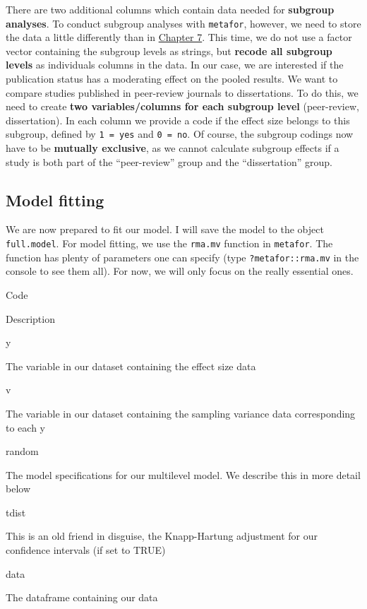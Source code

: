 \documentclass[]{book}
\begin{document}
There are two additional columns which contain data needed for \textbf{subgroup analyses}. To conduct subgroup analyses with \texttt{metafor}, however, we need to store the data a little differently than in \protect\hyperlink{subgroup}{Chapter 7}. This time, we do not use a factor vector containing the subgroup levels as strings, but \textbf{recode all subgroup levels} as individuals columns in the data. In our case, we are interested if the publication status has a moderating effect on the pooled results. We want to compare studies published in peer-review journals to dissertations. To do this, we need to create \textbf{two variables/columns for each subgroup level} (peer-review, dissertation). In each column we provide a code if the effect size belongs to this subgroup, defined by \texttt{1\ =\ yes} and \texttt{0\ =\ no}. Of course, the subgroup codings now have to be \textbf{mutually exclusive}, as we cannot calculate subgroup effects if a study is both part of the ``peer-review'' group and the ``dissertation'' group.

\hypertarget{model-fitting}{%
\subsection{Model fitting}\label{model-fitting}}

We are now prepared to fit our model. I will save the model to the object \texttt{full.model}. For model fitting, we use the \texttt{rma.mv} function in \texttt{metafor}. The function has plenty of parameters one can specify (type \texttt{?metafor::rma.mv} in the console to see them all). For now, we will only focus on the really essential ones.

Code

Description

y

The variable in our dataset containing the effect size data

v

The variable in our dataset containing the sampling variance data corresponding to each y

random

The model specifications for our multilevel model. We describe this in more detail below

tdist

This is an old friend in disguise, the Knapp-Hartung adjustment for our confidence intervals (if set to TRUE)

data

The dataframe containing our data
\end{document}
